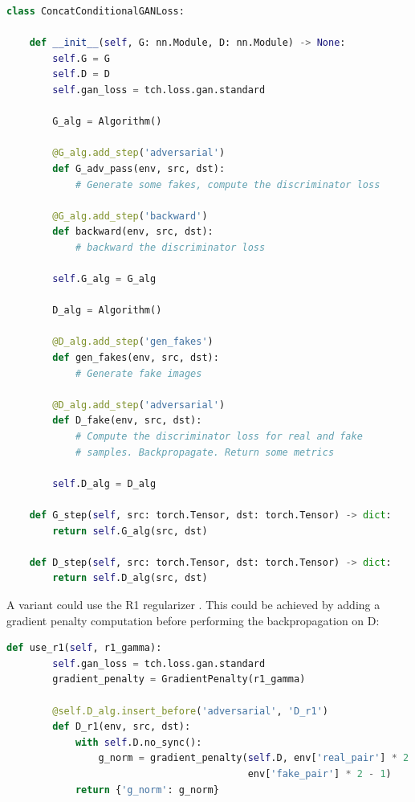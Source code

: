 \begin{lstlisting}[language=Python, caption=ConcatConditionalGAN. The implementation details are removed in order to focus on the design principles.]
class ConcatConditionalGANLoss:

    def __init__(self, G: nn.Module, D: nn.Module) -> None:
        self.G = G
        self.D = D
        self.gan_loss = tch.loss.gan.standard

        G_alg = Algorithm()

        @G_alg.add_step('adversarial')
        def G_adv_pass(env, src, dst):
            # Generate some fakes, compute the discriminator loss

        @G_alg.add_step('backward')
        def backward(env, src, dst):
            # backward the discriminator loss

        self.G_alg = G_alg

        D_alg = Algorithm()

        @D_alg.add_step('gen_fakes')
        def gen_fakes(env, src, dst):
            # Generate fake images

        @D_alg.add_step('adversarial')
        def D_fake(env, src, dst):
            # Compute the discriminator loss for real and fake
            # samples. Backpropagate. Return some metrics

        self.D_alg = D_alg

    def G_step(self, src: torch.Tensor, dst: torch.Tensor) -> dict:
        return self.G_alg(src, dst)

    def D_step(self, src: torch.Tensor, dst: torch.Tensor) -> dict:
        return self.D_alg(src, dst)
\end{lstlisting}

A variant could use the R1 regularizer \cite{R1}. This could be achieved by adding a gradient penalty computation before performing the backpropagation on D:

\begin{lstlisting}[language=Python, caption=ConcatConditionalGAN with R1 regularizer]
    def use_r1(self, r1_gamma):
        self.gan_loss = tch.loss.gan.standard
        gradient_penalty = GradientPenalty(r1_gamma)

        @self.D_alg.insert_before('adversarial', 'D_r1')
        def D_r1(env, src, dst):
            with self.D.no_sync():
                g_norm = gradient_penalty(self.D, env['real_pair'] * 2 - 1,
                                          env['fake_pair'] * 2 - 1)
            return {'g_norm': g_norm}
\end{lstlisting}

